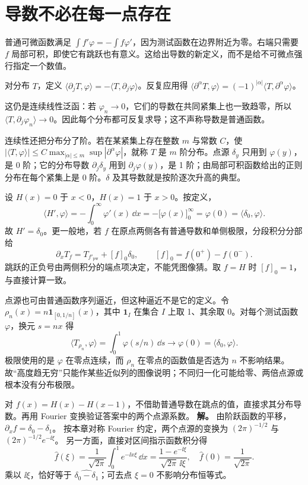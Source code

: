 \section{导数不必在每一点存在}

普通可微函数满足 \(\int f'\varphi=-\int f\varphi'\)，因为测试函数在边界附近为零。右端只需要 \(f\) 局部可积，即使它有跳跃也有意义。这给出导数的新定义，而不是给不可微点强行指定一个数值。

\begin{definition}[分布导数]
对分布 \(T\)，定义 \(\langle\partial_jT,\varphi\rangle=-\langle T,\partial_j\varphi\rangle\)。反复应用得 \(\langle\partial^\alpha T,\varphi\rangle=(-1)^{|\alpha|}\langle T,\partial^\alpha\varphi\rangle\)。
\end{definition}

这仍是连续线性泛函：若 \(\varphi_n\to0\)，它们的导数在共同紧集上也一致趋零，所以 \(\langle T,\partial_j\varphi_n\rangle\to0\)。因此每个分布都可反复求导；这不声称导数是普通函数。

连续性还把分布分了阶。若在某紧集上存在整数 \(m\) 与常数 \(C\)，使 \(|\langle T,\varphi\rangle|\le C\max_{|\alpha|\le m}\sup|\partial^\alpha\varphi|\)，就称 \(T\) 是 \(m\) 阶分布。点源 \(\delta_y\) 只用到 \(\varphi(y)\)，是 0 阶；它的分布导数 \(\partial_j\delta_y\) 用到 \(\partial_j\varphi(y)\)，是 1 阶；由局部可积函数给出的正则分布在每个紧集上是 0 阶。\(\delta\) 及其导数就是按阶逐次升高的典型。

设 \(H(x)=0\) 于 \(x<0\)，\(H(x)=1\) 于 \(x>0\)。按定义，
\[
\langle H',\varphi\rangle=-\int_0^\infty\varphi'(x)\,\dd x
=-\bigl[\varphi(x)\bigr]_{0}^{\infty}=\varphi(0)
=\langle\delta_0,\varphi\rangle.
\]
故 \(H'=\delta_0\)。更一般地，若 \(f\) 在原点两侧各有普通导数和单侧极限，分段积分分部给
\[
\partial_xT_f=T_{f'_{\mathrm{pw}}}+[f]_0\delta_0,
\qquad [f]_0=f(0^+)-f(0^-).
\]
跳跃的正负号由两侧积分的端点项决定，不能凭图像猜。取 \(f=H\) 时 \([f]_0=1\)，与直接计算一致。

点源也可由普通函数序列逼近，但这种逼近不是它的定义。令 \(\rho_n(x)=n\mathbf1_{[0,1/n]}(x)\)，其中 \(\mathbf1_I\) 在集合 \(I\) 上取 1、其余取 0。对每个测试函数 \(\varphi\)，换元 \(s=nx\) 得
\[
\langle T_{\rho_n},\varphi\rangle
=\int_0^1\varphi(s/n)\,\dd s\longrightarrow\varphi(0)
=\langle\delta_0,\varphi\rangle.
\]
极限使用的是 \(\varphi\) 在零点连续，而 \(\rho_n\) 在零点的函数值是否选为 \(n\) 不影响结果。故“高度趋无穷”只能作某些近似列的图像说明；不同归一化可能给零、两倍点源或根本没有分布极限。


\par
\begin{workedexample}
对 \(f(x)=H(x)-H(x-1)\)，不借助普通导数在跳点的值，直接求其分布导数。再用 Fourier 变换验证答案中的两个点源系数。
\textbf{解。} 由阶跃函数的平移，$\partial_xf=\delta_0-\delta_1$。
按本章对称 Fourier 约定，两个点源的变换为 $(2\pi)^{-1/2}$ 与 $(2\pi)^{-1/2}e^{-\ii\xi}$。
另一方面，直接对区间指示函数积分得
\[
\widehat f(\xi)=\frac1{\sqrt{2\pi}}\int_0^1e^{-\ii x\xi}\,\dd x
=\frac{1-e^{-\ii\xi}}{\sqrt{2\pi}\,\ii\xi},
\quad \widehat f(0)=\frac1{\sqrt{2\pi}}.
\]
乘以 $\ii\xi$，恰好等于 $\widehat{\delta_0-\delta_1}$；可去点 $\xi=0$ 不影响分布恒等式。
\end{workedexample}
\par
